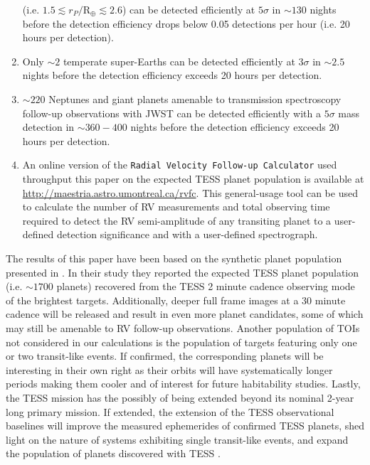 \begin{enumerate}
  (i.e. $1.5 \lesssim r_P/\text{R}_{\oplus} \lesssim 2.6$) can be detected efficiently at $5\sigma$
  in $\sim 130$ nights before the detection efficiency drops below 0.05 detections per hour
  (i.e. 20 hours per detection).
\item Only $\sim 2$ temperate super-Earths can be detected efficiently at $3\sigma$ in $\sim 2.5$ nights
  before the detection efficiency exceeds 20 hours per detection.
\item $\sim 220$ Neptunes and giant planets
  amenable to transmission spectroscopy follow-up observations with
  JWST can be detected efficiently with a $5\sigma$ mass detection in $\sim 360-400$ nights before
  the detection efficiency exceeds 20 hours per detection.
\item An online version of the \texttt{Radial Velocity Follow-up Calculator} used throughput this paper on the
  expected TESS planet population is available at
  \url{http://maestria.astro.umontreal.ca/rvfc}. This general-usage tool can be used to calculate the
  number of RV measurements and total observing time required to detect the RV semi-amplitude of any
  transiting planet to a user-defined detection significance and with a user-defined spectrograph.
\end{enumerate}

The results of this paper have been based on the synthetic planet population presented in
. In their study they reported the expected TESS planet population (i.e.
$\sim 1700$ planets) recovered from the TESS 2 minute cadence observing mode of the brightest targets.
Additionally, deeper full frame images at a 30 minute cadence will be released and result in even more planet
candidates, some of which may still be amenable to RV follow-up observations. Another population of TOIs
not considered in our calculations is the population of targets featuring only one or two transit-like events.
If confirmed, the corresponding planets will be interesting in their own right as their orbits will
have systematically longer periods making them cooler and of interest for future habitability studies. 
Lastly, the TESS mission has the possibly of being extended beyond its nominal 2-year long primary mission.
If extended, the extension of the TESS observational baselines will improve the measured ephemerides of confirmed TESS
planets, shed light on the nature of systems exhibiting single transit-like events, and expand the
population of planets discovered with TESS \cite[see the overview in][]{bouma17}. \\

